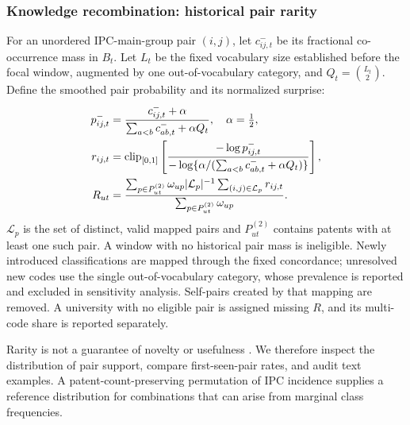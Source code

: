 \subsubsection{Knowledge recombination: historical pair rarity}
For an unordered IPC-main-group pair $(i,j)$, let $c_{ij,t}^{-}$ be its fractional
co-occurrence mass in $B_t$. Let $L_t$ be the fixed vocabulary size established
before the focal window, augmented by one out-of-vocabulary category, and
$Q_t=\binom{L_t}{2}$. Define the smoothed pair probability and its normalized surprise:
\begin{align}
 p_{ij,t}^{-}&=\frac{c_{ij,t}^{-}+\alpha}
 {\sum_{a<b}c_{ab,t}^{-}+\alpha Q_t},\quad \alpha=\tfrac12,\\
 r_{ij,t}&=\operatorname{clip}_{[0,1]}\left[
 \frac{-\log p_{ij,t}^{-}}{
 -\log\{\alpha/(\sum_{a<b}c_{ab,t}^{-}+\alpha Q_t)\}}\right],\\
 R_{ut}&=\frac{\sum_{p\in P_{ut}^{(2)}}\omega_{up}
       |\mathcal{L}_p|^{-1}\sum_{(i,j)\in\mathcal{L}_p}r_{ij,t}}
       {\sum_{p\in P_{ut}^{(2)}}\omega_{up}}.
 \label{eq:recombination}
\end{align}
$\mathcal{L}_p$ is the set of distinct, valid mapped pairs and $P_{ut}^{(2)}$
contains patents with at least one such pair. A window with no historical pair
mass is ineligible. Newly introduced classifications are mapped through the
fixed concordance; unresolved new codes use the single out-of-vocabulary category,
whose prevalence is reported and excluded in sensitivity analysis. Self-pairs
created by that mapping are removed. A university with no eligible pair is
assigned missing $R$, and its multi-code share is reported separately.

Rarity is not a guarantee of novelty or usefulness
\citep{fleming2001,youn2015,verhoeven2016}. We therefore inspect the distribution
of pair support, compare first-seen-pair rates, and audit text examples. A
patent-count-preserving permutation of IPC incidence supplies a reference
distribution for combinations that can arise from marginal class frequencies.

